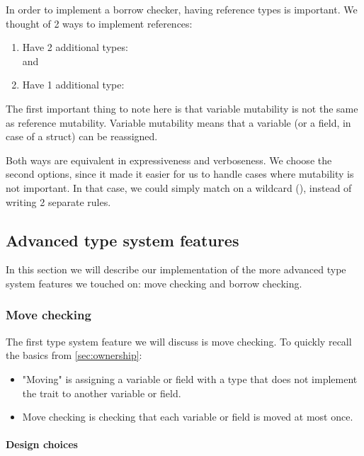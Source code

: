 In order to implement a borrow checker, having reference types is important. We thought of 2 ways to implement references:
\begin{enumerate}
    \item Have 2 additional types: \\ 
     and\\ 
    \item Have 1 additional type:
    \\ 
\end{enumerate}

The first important thing to note here is that variable mutability is not the same as reference mutability. Variable mutability means that a variable (or a field, in case of a struct) can be reassigned.

Both ways are equivalent in expressiveness and verboseness. We choose the second options, since it made it easier for us to handle cases where mutability is not important. In that case, we could simply match on a wildcard (\code{_}), instead of writing 2 separate rules.

\subsection{Advanced type system features}

In this section we will describe our implementation of the more advanced type system features we touched on: move checking and borrow checking.

\subsubsection{Move checking}

The first type system feature we will discuss is move checking. To quickly recall the basics from \autoref{sec:ownership}:
\begin{itemize}
    \item "Moving" is assigning a variable or field with a type that does not implement the  trait to another variable or field.
    \item Move checking is checking that each variable or field is moved at most once.
\end{itemize}

\paragraph{Design choices}

